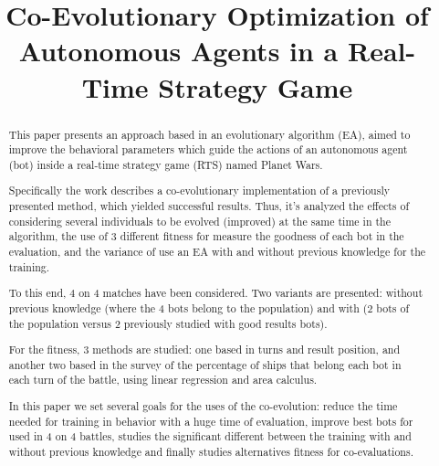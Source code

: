 \documentclass{llncs}
\begin{document}

\title{Co-Evolutionary Optimization of Autonomous Agents in a Real-Time Strategy Game}




%

\maketitle

%
%
\begin{abstract}
This paper presents an approach based in an evolutionary algorithm
(EA), aimed to improve the behavioral parameters which guide the
actions of an autonomous agent (bot) inside a real-time strategy game
(RTS) named Planet Wars. 

Specifically the work describes a co-evolutionary implementation of a
previously presented method, which yielded successful results.
Thus, it's analyzed the effects of considering several individuals
to be evolved (improved) at the same time in the algorithm,
the use of 3 different fitness for measure the goodness of each bot in the evaluation,
and the variance of use an EA with and without previous knowledge for the training.

To this end, 4 on 4 matches have been considered. Two variants are presented:
without previous knowledge (where the 4 bots belong to the population) and with
(2 bots of the population versus 2 previously studied with good results bots).

For the fitness, 3 methods are studied: one based in turns and result position,
and another two based in the survey of the percentage of ships that belong each bot in each turn of the battle, using linear regression and area calculus. 

In this paper we set several goals for the uses of the co-evolution:
reduce the time needed for training in behavior with a huge time of evaluation,
improve best bots for used in 4 on 4 battles,
studies the significant different between the training with and without previous knowledge
and finally studies alternatives fitness for co-evaluations.

\end{abstract}
\end{document}
